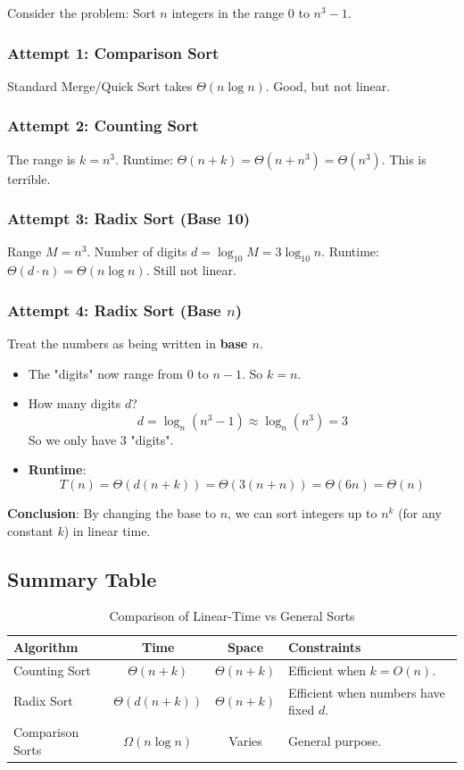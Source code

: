 \documentclass[12pt]{article}
\theoremstyle{blueplain}
\theoremstyle{bluedef}
\theoremstyle{blueremark}
\begin{document}
Consider the problem: Sort $n$ integers in the range $0$ to $n^3 - 1$.

\subsubsection{Attempt 1: Comparison Sort}
Standard Merge/Quick Sort takes $\Theta(n \log n)$. Good, but not linear.

\subsubsection{Attempt 2: Counting Sort}
The range is $k = n^3$.
Runtime: $\Theta(n + k) = \Theta(n + n^3) = \Theta(n^3)$. This is terrible.

\subsubsection{Attempt 3: Radix Sort (Base 10)}
Range $M = n^3$. Number of digits $d = \log_{10} M = 3 \log_{10} n$.
Runtime: $\Theta(d \cdot n) = \Theta(n \log n)$. Still not linear.

\subsubsection{Attempt 4: Radix Sort (Base $n$)}
Treat the numbers as being written in \textbf{base $n$}.
\begin{itemize}
    \item The "digits" now range from $0$ to $n-1$. So $k = n$.
    \item How many digits $d$?
          \[ d = \log_n (n^3 - 1) \approx \log_n (n^3) = 3 \]
          So we only have 3 "digits".
    \item \textbf{Runtime}:
          \[ T(n) = \Theta(d(n + k)) = \Theta(3(n + n)) = \Theta(6n) = \Theta(n) \]
\end{itemize}
\textbf{Conclusion}: By changing the base to $n$, we can sort integers up to $n^k$ (for any constant $k$) in linear time.

\subsection{Summary Table}

\begin{table}[h]
    \centering
    \begin{tabular}{|l|c|c|l|}
        \hline
        \textbf{Algorithm} & \textbf{Time}      & \textbf{Space} & \textbf{Constraints}                   \\ \hline
        Counting Sort      & $\Theta(n+k)$      & $\Theta(n+k)$  & Efficient when $k = O(n)$.             \\ \hline
        Radix Sort         & $\Theta(d(n+k))$   & $\Theta(n+k)$  & Efficient when numbers have fixed $d$. \\ \hline
        Comparison Sorts   & $\Omega(n \log n)$ & Varies         & General purpose.                       \\ \hline
    \end{tabular}
    \caption{Comparison of Linear-Time vs General Sorts}
\end{table}
\end{document}

